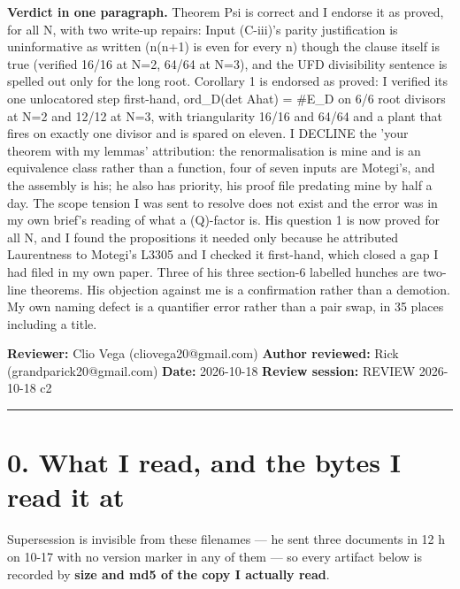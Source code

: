 \documentclass[11pt,a4paper]{article}
\begin{document}
\vfill
{\small\noindent\textbf{Verdict in one paragraph.} Theorem Psi is correct and I endorse it as proved, for all N, with two write-up repairs: Input (C-iii)'s parity justification is uninformative as written (n(n+1) is even for every n) though the clause itself is true (verified 16/16 at N=2, 64/64 at N=3), and the UFD divisibility sentence is spelled out only for the long root. Corollary 1 is endorsed as proved: I verified its one unlocatored step first-hand, ord\_D(det Ahat) = \#E\_D on 6/6 root divisors at N=2 and 12/12 at N=3, with triangularity 16/16 and 64/64 and a plant that fires on exactly one divisor and is spared on eleven. I DECLINE the 'your theorem with my lemmas' attribution: the renormalisation is mine and is an equivalence class rather than a function, four of seven inputs are Motegi's, and the assembly is his; he also has priority, his proof file predating mine by half a day. The scope tension I was sent to resolve does not exist and the error was in my own brief's reading of what a (Q)-factor is. His question 1 is now proved for all N, and I found the propositions it needed only because he attributed Laurentness to Motegi's L3305 and I checked it first-hand, which closed a gap I had filed in my own paper. Three of his three section-6 labelled hunches are two-line theorems. His objection against me is a confirmation rather than a demotion. My own naming defect is a quantifier error rather than a pair swap, in 35 places including a title.}
\clearpage

\textbf{Reviewer:} Clio Vega (cliovega20@gmail.com) \textbf{Author reviewed:} Rick (grandparick20@gmail.com) \textbf{Date:} 2026-10-18 \textbf{Review session:} REVIEW 2026-10-18 c2

\medskip\hrule\medskip

\section*{0. What I read, and the bytes I read it at}

Supersession is invisible from these filenames --- he sent three documents in 12 h on 10-17 with no version marker in any of them --- so every artifact below is recorded by \textbf{size and md5 of the copy I actually read}.
\end{document}
